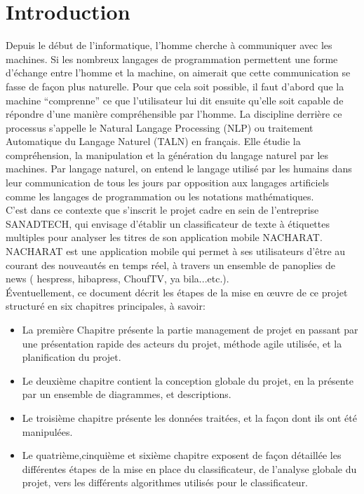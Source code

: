 
\chapter*{Introduction}
Depuis le début de l’informatique, l’homme cherche à communiquer avec les machines. Si les nombreux langages de programmation permettent une forme d’échange entre l’homme et la machine, on aimerait que cette communication se fasse de façon plus naturelle. Pour que cela soit possible, il faut d’abord que la machine “comprenne” ce que l’utilisateur lui dit ensuite qu’elle soit capable de répondre d’une manière compréhensible par l’homme. La discipline derrière ce processus s’appelle le Natural Langage Processing (NLP) ou traitement Automatique du Langage Naturel (TALN) en français. Elle étudie la compréhension, la manipulation et la génération du langage naturel par les machines. Par langage naturel, on entend le langage utilisé par les humains dans leur communication de tous les jours par opposition aux langages artificiels comme les langages de programmation ou les notations mathématiques.\\
C'est dans ce contexte que s'inscrit le projet cadre en sein de l'entreprise SANADTECH, qui envisage d'établir un classificateur de texte à étiquettes multiples pour analyser les titres de son application mobile NACHARAT.\\
NACHARAT est une application mobile qui permet à ses utilisateurs d'être au courant des nouveautés en temps réel, à travers un ensemble de panoplies de news ( hespress, hibapress, ChoufTV, ya bila...etc.).\\ 
Éventuellement, ce document décrit les étapes de la mise en œuvre de ce projet structuré en six chapitres principales, à savoir:

\begin{itemize}
\item La première Chapitre présente la partie management de projet en passant par une présentation rapide des acteurs du projet, méthode agile utilisée, et la planification du projet.
\item Le deuxième chapitre contient la conception globale du projet, en la présente par un ensemble de diagrammes, et descriptions.
\item Le troisième chapitre présente les données traitées, et la façon dont ils ont été manipulées.
\item Le quatrième,cinquième et sixième chapitre  exposent de façon détaillée les différentes étapes de la mise en place du classificateur, de l'analyse globale du projet, vers les différents algorithmes utilisés pour le classificateur.
\end{itemize}